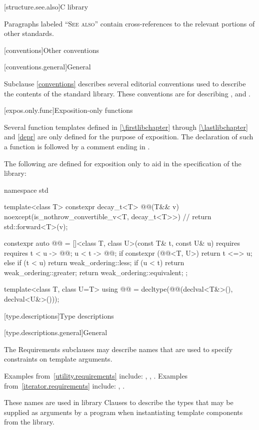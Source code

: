 [structure.see.also]{C library}

\pnum
Paragraphs labeled ``\textsc{See also}'' contain cross-references to the relevant portions
of other standards.

[conventions]{Other conventions}

[conventions.general]{General}
%

\pnum
Subclause \ref{conventions} describes several editorial conventions used to describe the contents
of the \Cpp{} standard library.
These conventions are for describing
,
and .

[expos.only.func]{Exposition-only functions}

\pnum
Several function templates
defined in \ref{\firstlibchapter} through \ref{\lastlibchapter} and \ref{depr}
are only defined for the purpose of exposition.
The declaration of such a function is followed by a comment ending in \expos.

\pnum
The following are defined for exposition only
to aid in the specification of the library:
%
\begin{codeblock}
namespace std {
  template<class T> constexpr decay_t<T> @@(T&& v)
      noexcept(is_nothrow_convertible_v<T, decay_t<T>>)         // \expos
    { return std::forward<T>(v); }

  constexpr auto @@ =
    []<class T, class U>(const T& t, const U& u)
      requires requires {
        { t < u } -> @@;
        { u < t } -> @@;
      }
    {
      if constexpr (@@<T, U>) {
        return t <=> u;
      } else {
        if (t < u) return weak_ordering::less;
        if (u < t) return weak_ordering::greater;
        return weak_ordering::equivalent;
      }
    };

  template<class T, class U=T>
  using @@ = decltype(@@(declval<T&>(), declval<U&>()));
}
\end{codeblock}

[type.descriptions]{Type descriptions}

[type.descriptions.general]{General}

\pnum
The Requirements subclauses may describe names that are used to specify
constraints on template arguments.
\begin{footnote}
Examples
from~\ref{utility.requirements} include:
,
,
.
Examples from~\ref{iterator.requirements} include:
,
.
\end{footnote}
These names are used in library Clauses
to describe the types that
may be supplied as arguments by a \Cpp{} program when instantiating template components from
the library.

